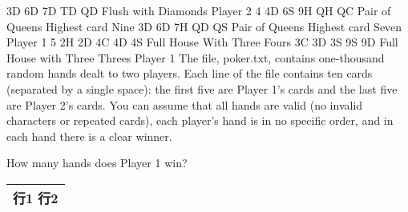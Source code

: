 3D 6D 7D TD QD
Flush with Diamonds
Player 2
4	 	4D 6S 9H QH QC
Pair of Queens
Highest card Nine
3D 6D 7H QD QS
Pair of Queens
Highest card Seven
Player 1
5	 	2H 2D 4C 4D 4S
Full House
With Three Fours
3C 3D 3S 9S 9D
Full House
with Three Threes
Player 1
The file, poker.txt, contains one-thousand random hands dealt to two players. Each line of the file contains ten cards (separated by a single space): the first five are Player 1's cards and the last five are Player 2's cards. You can assume that all hands are valid (no invalid characters or repeated cards), each player's hand is in no specific order, and in each hand there is a clear winner.

How many hands does Player 1 win?

\begin{tabular}{|c|}
	\hline
	行1 \newline 行2 \\ \hline
\end{tabular}
